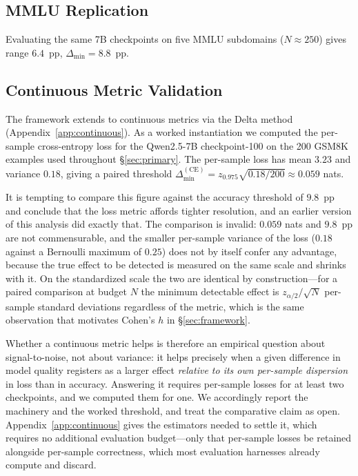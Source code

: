 \documentclass[pdflatex,sn-mathphys-ay,oneside]{sn-jnl}
\theoremstyle{thmstylethree}
\begin{document}
\subsection{MMLU Replication}\label{sec:mmlu}

Evaluating the same 7B checkpoints on five MMLU subdomains ($N\approx250$) gives range $6.4$~pp, $\Delta_{\min}=8.8$~pp.

\subsection{Continuous Metric Validation}\label{sec:continuous_val}

The framework extends to continuous metrics via the Delta method (Appendix~\ref{app:continuous}). As a worked instantiation we computed the per-sample cross-entropy loss for the Qwen2.5-7B checkpoint-100 on the 200 GSM8K examples used throughout \S\ref{sec:primary}. The per-sample loss has mean $3.23$ and variance $0.18$, giving a paired threshold $\Delta_{\min}^{(\text{CE})} = z_{0.975}\sqrt{0.18/200} \approx 0.059$ nats.

It is tempting to compare this figure against the accuracy threshold of $9.8$~pp and conclude that the loss metric affords tighter resolution, and an earlier version of this analysis did exactly that. The comparison is invalid: $0.059$ nats and $9.8$~pp are not commensurable, and the smaller per-sample variance of the loss ($0.18$ against a Bernoulli maximum of $0.25$) does not by itself confer any advantage, because the true effect to be detected is measured on the same scale and shrinks with it. On the standardized scale the two are identical by construction---for a paired comparison at budget $N$ the minimum detectable effect is $z_{\alpha/2}/\sqrt{N}$ per-sample standard deviations regardless of the metric, which is the same observation that motivates Cohen's $h$ in \S\ref{sec:framework}.

Whether a continuous metric helps is therefore an empirical question about signal-to-noise, not about variance: it helps precisely when a given difference in model quality registers as a larger effect \emph{relative to its own per-sample dispersion} in loss than in accuracy. Answering it requires per-sample losses for at least two checkpoints, and we computed them for one. We accordingly report the machinery and the worked threshold, and treat the comparative claim as open. Appendix~\ref{app:continuous} gives the estimators needed to settle it, which requires no additional evaluation budget---only that per-sample losses be retained alongside per-sample correctness, which most evaluation harnesses already compute and discard.
\end{document}
